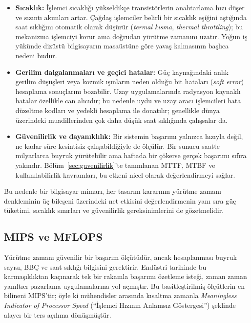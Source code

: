 \begin{itemize}
    \item \textbf{Sıcaklık:} İşlemci sıcaklığı yükseldikçe transistörlerin anahtarlama hızı düşer ve sızıntı akımları artar. Çağdaş işlemciler belirli bir sıcaklık eşiğini aştığında saat sıklığını otomatik olarak düşürür (\emph{termal kısma}, \emph{thermal throttling}); bu mekanizma işlemciyi korur ama doğrudan yürütme zamanını uzatır. Yoğun iş yükünde dizüstü bilgisayarın masaüstüne göre yavaş kalmasının başlıca nedeni budur.

    \item \textbf{Gerilim dalgalanmaları ve geçici hatalar:} Güç kaynağındaki anlık gerilim düşüşleri veya kozmik ışınların neden olduğu bit hataları (\emph{soft error}) hesaplama sonuçlarını bozabilir. Uzay uygulamalarında radyasyon kaynaklı hatalar özellikle can alıcıdır; bu nedenle uydu ve uzay aracı işlemcileri hata düzeltme kodları ve yedekli hesaplama ile donatılır; genellikle dünya üzerindeki muadillerinden çok daha düşük saat sıklığında çalışsalar da.

    \item \textbf{Güvenilirlik ve dayanıklılık:} Bir sistemin başarımı yalnızca hızıyla değil, ne kadar süre kesintisiz çalışabildiğiyle de ölçülür. Bir sunucu saatte milyarlarca buyruk yürütebilir ama haftada bir çökerse gerçek başarımı sıfıra yakındır. Bölüm~\ref{sec:guvenilirlik}'te tanımlanan MTTF, MTBF ve kullanılabilirlik kavramları, bu etkeni nicel olarak değerlendirmeyi sağlar.
\end{itemize}

Bu nedenle bir bilgisayar mimarı, her tasarım kararının yürütme zamanı denkleminin üç bileşeni üzerindeki net etkisini değerlendirmenin yanı sıra güç tüketimi, sıcaklık sınırları ve güvenilirlik gereksinimlerini de gözetmelidir.


\subsection{MIPS ve MFLOPS}
\label{subsec:mips-mflops}

Yürütme zamanı güvenilir bir başarım ölçütüdür, ancak hesaplanması buyruk sayısı, BBÇ ve saat sıklığı bilgisini gerektirir. Endüstri tarihinde bu karmaşıklıktan kaçınarak tek bir rakamla başarımı özetleme isteği, zaman zaman yanıltıcı pazarlama uygulamalarına yol açmıştır. Bu basitleştirilmiş ölçütlerin en bilineni MIPS'tir; öyle ki mühendisler arasında kısaltma zamanla \emph{Meaningless Indicator of Processor Speed} (``İşlemci Hızının Anlamsız Göstergesi'') şeklinde alaycı bir ters açılıma dönüşmüştür.

